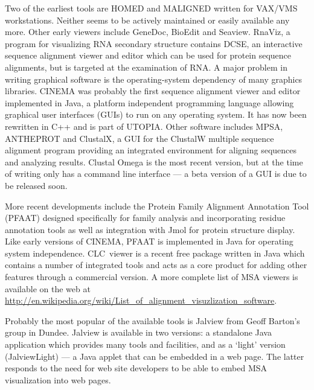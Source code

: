 \documentclass[a4]{bioinfo}
\begin{document}
Two of the earliest tools are HOMED\cite{stockwell:homed} and
MALIGNED\cite{clark:maligned} written for VAX/VMS workstations.
Neither seems to be actively maintained or easily available any
more. Other early viewers include GeneDoc\cite{nicholas:genedoc},
BioEdit and Seaview\cite{galtier:seaview}. RnaViz\cite{derijk:rnaviz},
a program for visualizing RNA secondary structure contains
DCSE\cite{derijk:dcse}, an interactive sequence alignment viewer and
editor which can be used for protein sequence alignments, but is
targeted at the examination of RNA. A major problem in writing
graphical software is the operating-system dependency of many graphics
libraries. CINEMA\cite{parrysmith:cinema} was probably the first
sequence alignment viewer and editor implemented in Java, a platform
independent programming language allowing graphical user interfaces
(GUIs) to run on any operating system. It has now been rewritten in
C++ and is part of UTOPIA\cite{pettifer:utopia}. Other software
includes MPSA\cite{blanchet:mpsa}, ANTHEPROT\cite{deleage:antheprot}
and ClustalX\cite{thompson:clustalx}, a GUI for the ClustalW multiple
sequence alignment program providing an integrated environment for
aligning sequences and analyzing results. Clustal Omega is the
most recent version, but at the time of writing
only has a command line interface --- a beta version of a GUI is due
to be released soon.

More recent developments include the Protein Family Alignment
Annotation Tool (PFAAT)\cite{johnson:pfaat} designed specifically for
family analysis and incorporating residue annotation tools as well as
integration with Jmol for protein structure display. Like early
versions of CINEMA, PFAAT is implemented in Java for operating system
independence. CLC~viewer is a recent free package written in Java
which contains a number of integrated tools and acts as a core product
for adding other features through a commercial version.  A more
complete list of MSA viewers is available on the web at
\url{http://en.wikipedia.org/wiki/List_of_alignment_visuzlization_software}.

Probably the most popular of the available tools is Jalview from Geoff
Barton's group in Dundee\cite{clamp:jalview}. Jalview is available in
two versions: a standalone Java application which provides many tools
and facilities, and as a `light' version (JalviewLight) --- a Java
applet that can be embedded in a web page. The latter responds to the
need for web site developers to be able to embed MSA visualization
into web pages.
\end{document}
